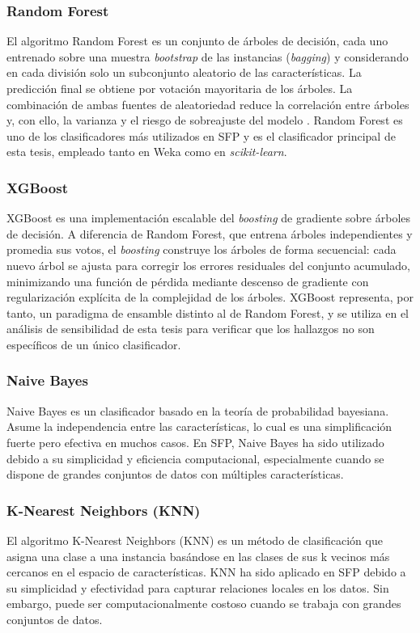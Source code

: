 \subsubsection{Random Forest}
El algoritmo Random Forest \cite{breiman2001} es un conjunto de árboles de decisión, cada uno entrenado sobre una muestra \textit{bootstrap} de las instancias (\textit{bagging}) y considerando en cada división solo un subconjunto aleatorio de las características. La predicción final se obtiene por votación mayoritaria de los árboles. La combinación de ambas fuentes de aleatoriedad reduce la correlación entre árboles y, con ello, la varianza y el riesgo de sobreajuste del modelo \cite{shah_comparative_2020}. Random Forest es uno de los clasificadores más utilizados en SFP y es el clasificador principal de esta tesis, empleado tanto en Weka \cite{weka} como en \textit{scikit-learn}.

\subsubsection{XGBoost}
XGBoost \cite{chen2016} es una implementación escalable del \textit{boosting} de gradiente sobre árboles de decisión. A diferencia de Random Forest, que entrena árboles independientes y promedia sus votos, el \textit{boosting} construye los árboles de forma secuencial: cada nuevo árbol se ajusta para corregir los errores residuales del conjunto acumulado, minimizando una función de pérdida mediante descenso de gradiente con regularización explícita de la complejidad de los árboles. XGBoost representa, por tanto, un paradigma de ensamble distinto al de Random Forest, y se utiliza en el análisis de sensibilidad de esta tesis para verificar que los hallazgos no son específicos de un único clasificador.

\subsubsection{Naive Bayes}
Naive Bayes es un clasificador basado en la teoría de probabilidad bayesiana. Asume la independencia entre las características, lo cual es una simplificación fuerte pero efectiva en muchos casos. En SFP, Naive Bayes ha sido utilizado debido a su simplicidad y eficiencia computacional, especialmente cuando se dispone de grandes conjuntos de datos con múltiples características.

\subsubsection{K-Nearest Neighbors (KNN)}
El algoritmo K-Nearest Neighbors (KNN) es un método de clasificación que asigna una clase a una instancia basándose en las clases de sus k vecinos más cercanos en el espacio de características. KNN ha sido aplicado en SFP debido a su simplicidad y efectividad para capturar relaciones locales en los datos. Sin embargo, puede ser computacionalmente costoso cuando se trabaja con grandes conjuntos de datos.

